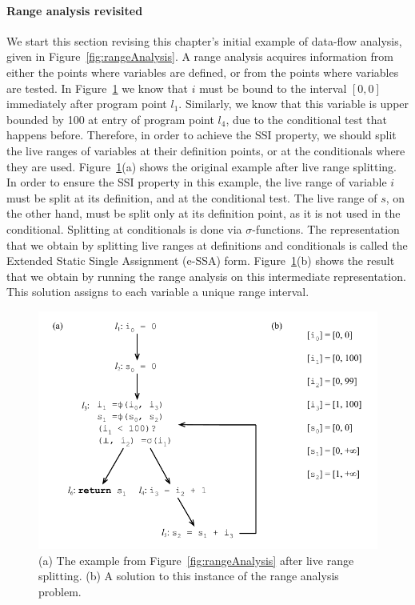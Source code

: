 \paragraph{Range analysis revisited}
We start this section revising this chapter's initial example of data-flow analysis, given in Figure~\ref{fig:rangeAnalysis}.
A range analysis acquires information from either the points where variables are defined, or from the points where variables are tested.
In Figure~\ref{fig:rangeAnalysis-sparse} we know that $i$ must be bound to the interval $[0, 0]$ immediately after program point $l_1$.
Similarly, we know that this variable is upper bounded by 100 at entry of program point $l_4$, due to the conditional test that happens before.
Therefore, in order to achieve the SSI property, we should split the live ranges of variables at their definition points, or at the conditionals where they are used.
Figure~\ref{fig:rangeAnalysis-sparse}(a) shows the original example after live range splitting.
In order to ensure the SSI property in this example, the live range of variable $i$ must be split at its definition, and at the conditional test.
The live range of $s$, on the other hand, must be split only at its definition point, as it is not used in the conditional.
Splitting at conditionals is done via $\sigma$-functions.
The representation that we obtain by splitting live ranges at definitions and conditionals is called the Extended Static Single Assignment (e-SSA) form.
Figure~\ref{fig:rangeAnalysis-sparse}(b) shows the result that we obtain by running the range analysis on this intermediate representation.
This solution assigns to each variable a unique range interval.

\begin{figure}[t!]
\centering
\includegraphics[width=\linewidth]{RangeAnalysis}
\caption{(a) The example from Figure~\ref{fig:rangeAnalysis} after live range splitting.
(b) A solution to this instance of the range analysis problem.}
\label{fig:rangeAnalysis-sparse}
\end{figure}



